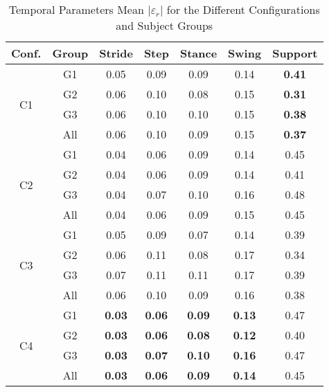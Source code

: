 \begin{table}[t]
	\centering
	\caption{Temporal Parameters Mean $|\varepsilon_r|$ for the Different Configurations and Subject Groups}
	\label{tab:mean_error_temp}
	\begin{tabular}{@{}ccccccc@{}}
		\hline
		Conf.               & Group & Stride        & Step          & Stance        & Swing         & Support       \\ \hline
\multirow{4}{*}{C1} & G1    & 0.05          & 0.09          & 0.09          & 0.14          & \textbf{0.41} \\
& G2    & 0.06          & 0.10          & 0.08          & 0.15          & \textbf{0.31} \\
& G3    & 0.06          & 0.10          & 0.10          & 0.15          & \textbf{0.38} \\
& All & 0.06          & 0.10          & 0.09          & 0.15          & \textbf{0.37} \\ \hline
\multirow{4}{*}{C2} & G1    & 0.04          & 0.06          & 0.09          & 0.14          & 0.45          \\
& G2    & 0.04          & 0.06          & 0.09          & 0.14          & 0.41          \\
& G3    & 0.04          & 0.07          & 0.10          & 0.16          & 0.48          \\
& All & 0.04          & 0.06          & 0.09          & 0.15          & 0.45          \\ \hline
\multirow{4}{*}{C3} & G1    & 0.05          & 0.09          & 0.07          & 0.14          & 0.39          \\
& G2    & 0.06          & 0.11          & 0.08          & 0.17          & 0.34          \\
& G3    & 0.07          & 0.11          & 0.11          & 0.17          & 0.39          \\
& All & 0.06          & 0.10          & 0.09          & 0.16          & 0.38          \\ \hline
\multirow{4}{*}{C4} & G1    & \textbf{0.03} & \textbf{0.06} & \textbf{0.09} & \textbf{0.13} & 0.47          \\
& G2    & \textbf{0.03} & \textbf{0.06} & \textbf{0.08} & \textbf{0.12} & 0.40          \\
& G3    & \textbf{0.03} & \textbf{0.07} & \textbf{0.10} & \textbf{0.16} & 0.47          \\
& All	 & \textbf{0.03} & \textbf{0.06} & \textbf{0.09} & \textbf{0.14} & 0.45          \\ \hline
	\end{tabular}
\end{table}